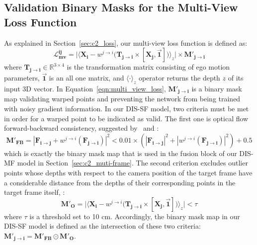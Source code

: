 \subsection{Validation Binary Masks for the Multi-View Loss Function} \label{sec:c2_binary_masks}
As explained in Section~\ref{sec:c2_loss}, our multi-view loss function is defined as:
\begin{equation} \label{eqn:multi_view_loss}
    \boldsymbol{\mathcal{L}^{ij}_{mv}}=
    \bigg|
    \Big \langle \boldsymbol{X_{i}} -
    w^{j \rightarrow i}
    \big( \boldsymbol{T_{j \rightarrow i}} \times [\boldsymbol{X_{j}},\vec{\mathbf{1}}] \big) \Big \rangle_z
    \bigg| \times \boldsymbol{M'_{j \rightarrow i}}
\end{equation}
where $\boldsymbol{T_{j \rightarrow i}} \in \mathbb{R}^{3 \times 4}$ is the transformation matrix consisting of ego motion parameters, $\vec{\mathbf{1}}$ is an all one matrix, and $\langle\cdot\rangle_z$ operator returns the depth $z$ of its input 3D vector. In Equation~\eqref{eqn:multi_view_loss}, $\boldsymbol{M'_{j \rightarrow i}}$ is a binary mask map validating warped points and preventing the network from being trained with noisy gradient information. In our DIS-SF model, two criteria must be met in order for a warped point to be indicated as valid. The first one is optical flow forward-backward consistency, suggested by~\cite{zou2018df} and \cite{meister2017unflow}:
\begin{equation}\label{eqn:supp_flow_forward_backward}
    \boldsymbol{M'_{FB}} = |\boldsymbol{F_{i \rightarrow j}} + w^{j \rightarrow i}(\boldsymbol{F_{j \rightarrow i}})|^2 < 0.01 \times (|\boldsymbol{F_{i \rightarrow j}}|^2 + |w^{j \rightarrow i}(\boldsymbol{F_{j \rightarrow i}})|^2) + 0.5
\end{equation}
which is exactly the binary mask map that is used in the fusion block of our DIS-MF model in Section~\ref{sec:c2_muti-frame}. The second criterion excludes outlier points whose depths with respect to the camera position of the target frame have a considerable distance from the depths of their corresponding points in the target frame itself, \ie:
\begin{equation}
    \boldsymbol{M'_{O}} = \bigg|
    \Big \langle \boldsymbol{X_{i}} -
    w^{j \rightarrow i}
    \big( \boldsymbol{T_{j \rightarrow i}} \times [\boldsymbol{X_{j}},\vec{\mathbf{1}}] \big) \Big \rangle_z
    \bigg| < \tau
\end{equation}
where $\tau$ is a threshold set to 10 cm. Accordingly, the binary mask map in our DIS-SF model is defined as the intersection of these two criteria: $\boldsymbol{M'_{j \rightarrow i}} = \boldsymbol{M'_{FB}} \odot \boldsymbol{M'_{O}}$.

